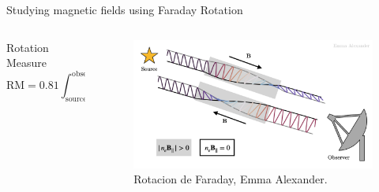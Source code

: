 \documentclass[xetex,aspectratio=169]{beamer}
\begin{document}
	\begin{frame}{Studying magnetic fields using Faraday Rotation}
		\begin{columns}
			
			\begin{column}{0.55\textwidth}
				
				
				
				\begin{block}{Rotation Measure}
					\begin{equation*}
						\text{RM} = 0.81 \int_{\text{source}}^{\text{observer}} n_e(r) B_{||}(r) \cdot dr\; \text{rad}\;\text{m}^{-2}
					\end{equation*}
				\end{block}
				
			\end{column}
			
			\begin{column}{0.45\textwidth}
				\begin{figure}
					\centering
					\includegraphics[width=\textwidth, keepaspectratio]{figures/faraday_rotation/faraday_rot.png}
					\caption*{Rotacion de Faraday, Emma Alexander.}
				\end{figure}
			\end{column}
		\end{columns}
		
	\end{frame}
	
\end{document}
